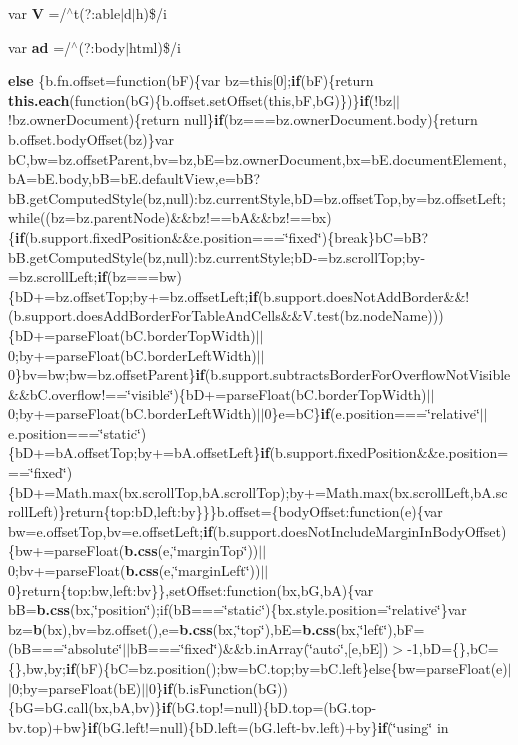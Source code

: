 \begin{DoxyCompactItemize}
\item 
var {\bf V} =/$^\wedge$t(?\-:able$\vert$d$\vert$h)\$/i
\item 
var {\bf ad} =/$^\wedge$(?\-:body$\vert$html)\$/i
\item 
{\bf else} \{b.\-fn.\-offset=function(b\-F)\{var bz=this[0];{\bf if}(b\-F)\{return {\bf this.\-each}(function(b\-G)\{b.\-offset.\-set\-Offset(this,b\-F,b\-G)\})\}{\bf if}(!bz$\vert$$\vert$!bz.\-owner\-Document)\{return null\}{\bf if}(bz===bz.\-owner\-Document.\-body)\{return b.\-offset.\-body\-Offset(bz)\}var b\-C,bw=bz.\-offset\-Parent,bv=bz,b\-E=bz.\-owner\-Document,bx=b\-E.\-document\-Element,b\-A=b\-E.\-body,b\-B=b\-E.\-default\-View,e=b\-B?b\-B.\-get\-Computed\-Style(bz,null)\-:bz.\-current\-Style,b\-D=bz.\-offset\-Top,by=bz.\-offset\-Left;while((bz=bz.\-parent\-Node)\&\&bz!==b\-A\&\&bz!==bx)\{{\bf if}(b.\-support.\-fixed\-Position\&\&e.\-position===\char`\"{}fixed\char`\"{})\{break\}b\-C=b\-B?b\-B.\-get\-Computed\-Style(bz,null)\-:bz.\-current\-Style;b\-D-\/=bz.\-scroll\-Top;by-\/=bz.\-scroll\-Left;{\bf if}(bz===bw)\{b\-D+=bz.\-offset\-Top;by+=bz.\-offset\-Left;{\bf if}(b.\-support.\-does\-Not\-Add\-Border\&\&!(b.\-support.\-does\-Add\-Border\-For\-Table\-And\-Cells\&\&V.\-test(bz.\-node\-Name)))\{b\-D+=parse\-Float(b\-C.\-border\-Top\-Width)$\vert$$\vert$0;by+=parse\-Float(b\-C.\-border\-Left\-Width)$\vert$$\vert$0\}bv=bw;bw=bz.\-offset\-Parent\}{\bf if}(b.\-support.\-subtracts\-Border\-For\-Overflow\-Not\-Visible\&\&b\-C.\-overflow!==\char`\"{}visible\char`\"{})\{b\-D+=parse\-Float(b\-C.\-border\-Top\-Width)$\vert$$\vert$0;by+=parse\-Float(b\-C.\-border\-Left\-Width)$\vert$$\vert$0\}e=b\-C\}{\bf if}(e.\-position===\char`\"{}relative\char`\"{}$\vert$$\vert$e.\-position===\char`\"{}static\char`\"{})\{b\-D+=b\-A.\-offset\-Top;by+=b\-A.\-offset\-Left\}{\bf if}(b.\-support.\-fixed\-Position\&\&e.\-position===\char`\"{}fixed\char`\"{})\{b\-D+=Math.\-max(bx.\-scroll\-Top,b\-A.\-scroll\-Top);by+=Math.\-max(bx.\-scroll\-Left,b\-A.\-scroll\-Left)\}return\{top\-:b\-D,left\-:by\}\}\}b.\-offset=\{body\-Offset\-:function(e)\{var bw=e.\-offset\-Top,bv=e.\-offset\-Left;{\bf if}(b.\-support.\-does\-Not\-Include\-Margin\-In\-Body\-Offset)\{bw+=parse\-Float({\bf b.\-css}(e,\char`\"{}margin\-Top\char`\"{}))$\vert$$\vert$0;bv+=parse\-Float({\bf b.\-css}(e,\char`\"{}margin\-Left\char`\"{}))$\vert$$\vert$0\}return\{top\-:bw,left\-:bv\}\},set\-Offset\-:function(bx,b\-G,b\-A)\{var b\-B={\bf b.\-css}(bx,\char`\"{}position\char`\"{});if(b\-B===\char`\"{}static\char`\"{})\{bx.\-style.\-position=\char`\"{}relative\char`\"{}\}var bz={\bf b}(bx),bv=bz.\-offset(),e={\bf b.\-css}(bx,\char`\"{}top\char`\"{}),b\-E={\bf b.\-css}(bx,\char`\"{}left\char`\"{}),b\-F=(b\-B===\char`\"{}absolute\char`\"{}$\vert$$\vert$b\-B===\char`\"{}fixed\char`\"{})\&\&b.\-in\-Array(\char`\"{}auto\char`\"{},[e,b\-E])$>$-\/1,b\-D=\{\},b\-C=\{\},bw,by;{\bf if}(b\-F)\{b\-C=bz.\-position();bw=b\-C.\-top;by=b\-C.\-left\}else\{bw=parse\-Float(e)$\vert$$\vert$0;by=parse\-Float(b\-E)$\vert$$\vert$0\}{\bf if}(b.\-is\-Function(b\-G))\{b\-G=b\-G.\-call(bx,b\-A,bv)\}{\bf if}(b\-G.\-top!=null)\{b\-D.\-top=(b\-G.\-top-\/bv.\-top)+bw\}{\bf if}(b\-G.\-left!=null)\{b\-D.\-left=(b\-G.\-left-\/bv.\-left)+by\}{\bf if}(\char`\"{}using\char`\"{} in 
\end{DoxyCompactItemize}
